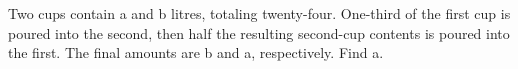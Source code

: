Two cups contain a and b litres, totaling twenty-four. One-third of the first cup is poured into the second, then half the resulting second-cup contents is poured into the first. The final amounts are b and a, respectively. Find a.
